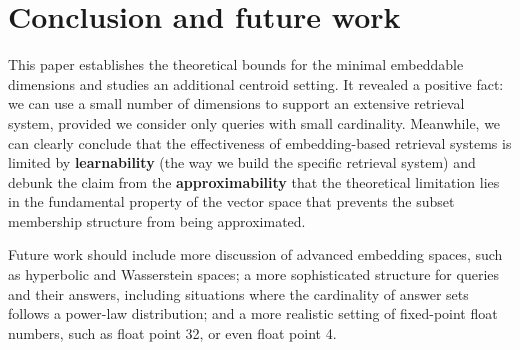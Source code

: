 









\section{Conclusion and future work}\label{sec:conclusion}

This paper establishes the theoretical bounds for the minimal embeddable dimensions and studies an additional centroid setting. It revealed a positive fact: we can use a small number of  dimensions to support an extensive retrieval system, provided we consider only queries with small cardinality. Meanwhile, we can clearly conclude that the effectiveness of embedding-based retrieval systems is limited by \textbf{learnability} (the way we build the specific retrieval system) and debunk the claim from the \textbf{approximability} that the theoretical limitation lies in the fundamental property of the vector space that prevents the subset membership structure from being approximated.

Future work should include more discussion of advanced embedding spaces, such as hyperbolic and Wasserstein spaces; a more sophisticated structure for queries and their answers, including situations where the cardinality of answer sets follows a power-law distribution; and a more realistic setting of fixed-point float numbers, such as float point 32, or even float point 4.
